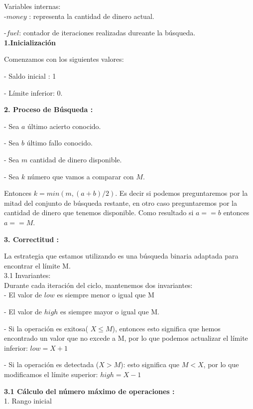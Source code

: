 \documentclass[
10pt, %
a4paper, %
oneside, %
headinclude,footinclude, %
BCOR5mm, %
]{scrartcl}
\begin{document}
Variables internas: \\

-$money$ : representa la cantidad de dinero actual.

-$fuel$: contador de iteraciones realizadas dureante la búsqueda. \\

\textbf{1.Inicialización}
 
Comenzamos con los siguientes valores:

- Saldo inicial : 1


- Límite inferior: 0.

\textbf{2. Proceso de Búsqueda :} 

- Sea $a$ último acierto conocido.

- Sea $b$ último fallo conocido.

- Sea $m$ cantidad de dinero disponible.

- Sea $k$ número que vamos a comparar 
con $M$.


Entonces $k = min(m, (a+b)/2)$. Es 
decir si podemos preguntaremos por la 
mitad del conjunto de búsqueda 
restante, en otro caso preguntaremos 
por la cantidad de dinero que tenemos 
disponible. Como resultado si $a == b$ 
entonces $a == M$.


\textbf{3. Correctitud :} 

La estrategia que estamos utilizando es una búsqueda binaria adaptada para encontrar el límite M.\\


3.1 Invariantes:\\

Durante cada iteración del ciclo, mantenemos dos invariantes:\\


- El valor de $low$ es siempre menor o igual que M


- El valor de $high$ es siempre mayor o igual que M.


- Si la operación es exitosa( $X \leq M$), entonces esto significa que hemos encontrado un valor que no excede a M, por lo que podemos actualizar el límite inferior: $low = X+1$


- Si la operación es detectada ($X > M$): esto significa que $M < X$, por lo que modificamos el límite superior: $high = X -1$

\textbf{3.1 Cálculo del número máximo de operaciones :}\\

1. Rango inicial \\
\end{document}
